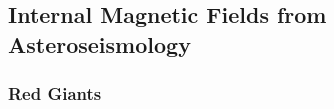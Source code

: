 {\color{red}
\subsection{Internal Magnetic Fields from Asteroseismology}

\subsubsection{Red Giants}

\sub



}